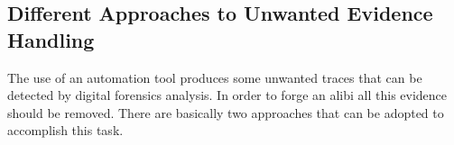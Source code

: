\documentclass[runningheads]{llncs}
\begin{document}
%
%
%
%

\subsection{Different Approaches to Unwanted Evidence Handling}
\label{sub:meth}
The use of an automation tool produces some unwanted traces that can be 
detected by digital forensics analysis. In order to forge an alibi all this evidence 
should be removed. There are basically two approaches that can be adopted 
to accomplish this task.
\end{document}
